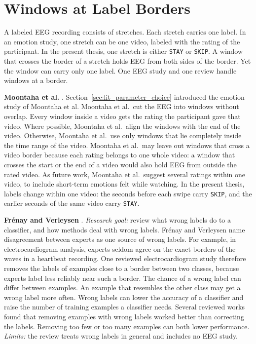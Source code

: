 \documentclass[12pt,a4paper]{report}
\begin{document}
\section{Windows at Label Borders}
\label{sec:lit_label_borders}
A labeled EEG recording consists of stretches. Each stretch carries one label. In an emotion study, one stretch can be one video, labeled with the rating of the participant. In the present thesis, one stretch is either \texttt{STAY} or \texttt{SKIP}. A window that crosses the border of a stretch holds EEG from both sides of the border. Yet the window can carry only one label. One EEG study and one review handle windows at a border.

\textbf{Moontaha et al.} \cite{moontaha_online_2023-1}. Section~\ref{sec:lit_parameter_choice} introduced the emotion study of Moontaha et al. Moontaha et al.\ cut the EEG into windows without overlap. Every window inside a video gets the rating the participant gave that video. Where possible, Moontaha et al.\ align the windows with the end of the video. Otherwise, Moontaha et al.\ use only windows that lie completely inside the time range of the video. Moontaha et al.\ may leave out windows that cross a video border because each rating belongs to one whole video: a window that crosses the start or the end of a video would also hold EEG from outside the rated video. As future work, Moontaha et al.\ suggest several ratings within one video, to include short-term emotions felt while watching. In the present thesis, labels change within one video: the seconds before each swipe carry \texttt{SKIP}, and the earlier seconds of the same video carry \texttt{STAY}.

\textbf{Frénay and Verleysen} \cite{frenay_classification_2014}. \emph{Research goal:} review what wrong labels do to a classifier, and how methods deal with wrong labels. Frénay and Verleysen name disagreement between experts as one source of wrong labels. For example, in electrocardiogram analysis, experts seldom agree on the exact borders of the waves in a heartbeat recording. One reviewed electrocardiogram study therefore removes the labels of examples close to a border between two classes, because experts label less reliably near such a border. The chance of a wrong label can differ between examples. An example that resembles the other class may get a wrong label more often. Wrong labels can lower the accuracy of a classifier and raise the number of training examples a classifier needs. Several reviewed works found that removing examples with wrong labels worked better than correcting the labels. Removing too few or too many examples can both lower performance. \emph{Limits:} the review treats wrong labels in general and includes no EEG study.
\end{document}

